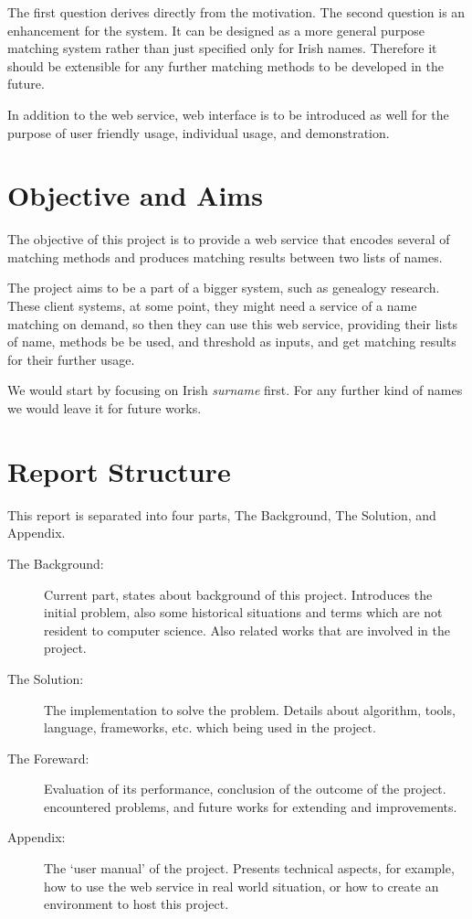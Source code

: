 The first question derives directly from the motivation.
The second question is an enhancement for the system. It can be designed
as a more general purpose matching system rather than just specified
only for Irish names. Therefore it should be extensible for any further
matching methods to be developed in the future.

In addition to the web service, web interface is to be introduced as well
for the purpose of user friendly usage, individual usage, and demonstration.

\section{Objective and Aims}
\label{sec:obj}

The objective of this project is to provide a web service that
encodes several of matching methods and produces matching
results between two lists of names.

The project aims to be a part of a bigger system, such as
genealogy research. These client systems, at some point,
they might need a service of a name matching on demand, so then they can use this
web service, providing their lists of name, methods be be used,
and threshold as inputs, and get matching results for their further usage.

We would start by focusing on Irish \textit{surname} first.
For any further kind of names we would leave it for future works.

\section{Report Structure}

This report is separated into four parts, The Background, The Solution,
and Appendix.

\begin{description}
\item[The Background:]
  Current part, states about background of this project. Introduces
  the initial problem, also some historical situations and terms
  which are not resident to computer science. Also related works
  that are involved in the project.
\item[The Solution:]
  The implementation to solve the problem. Details about algorithm,
  tools, language, frameworks, etc. which being used in the project.
\item[The Foreward:]
  Evaluation of its performance, conclusion of the outcome of the project.
  encountered problems, and future works for extending and improvements.
\item[Appendix:]
  The `user manual' of the project. Presents technical aspects,
  for example, how to use the web service in real world situation,
  or how to create an environment to host this project.
\end{description}
